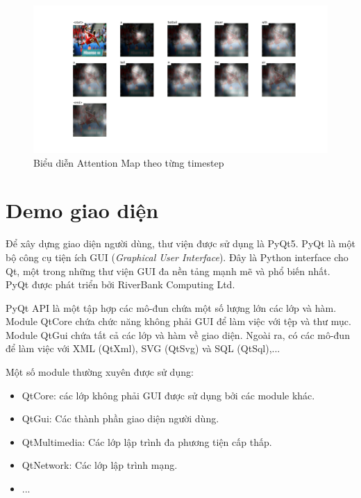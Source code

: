 \documentclass[14pt, a4paper]{article}
\numberwithin{equation}{section}
\numberwithin{algorithm}{section}
\numberwithin{figure}{section}
\numberwithin{table}{section}
\numberwithin{dl}{section}
\numberwithin{md}{section}
\numberwithin{bd}{section}
\numberwithin{dn}{section}
\numberwithin{hq}{section}
\begin{document}
    \begin{figure}[h!] \centering

        \includegraphics[scale=0.3]{Attention_Sample_2.png}
        \caption{Biểu diễn Attention Map theo từng timestep}
        \label{fig:Attention_Sample_2}

    \end{figure}
    
    \section{Demo giao diện}
    
    Để xây dựng giao diện người dùng, thư viện được sử dụng là PyQt5.
    PyQt là một bộ công cụ tiện ích GUI (\textit{Graphical User Interface}). 
    Đây là Python interface cho Qt, một trong những thư viện GUI đa nền tảng mạnh mẽ và phổ biến nhất. 
    PyQt được phát triển bởi RiverBank Computing Ltd.

    PyQt API là một tập hợp các mô-đun chứa một số lượng lớn các lớp và hàm. 
    Module QtCore chứa chức năng không phải GUI để làm việc với tệp và thư mục. 
    Module QtGui chứa tất cả các lớp và hàm về giao diện. Ngoài ra, có các mô-đun để làm việc với XML (QtXml), SVG (QtSvg) và SQL (QtSql),...

    Một số module thường xuyên được sử dụng:

    \begin{itemize}
        \item QtCore: các lớp không phải GUI được sử dụng bởi các module khác.
        \item QtGui: Các thành phần giao diện người dùng.
        \item QtMultimedia: Các lớp lập trình đa phương tiện cấp thấp.
        \item QtNetwork: Các lớp lập trình mạng.
        \item ...
    \end{itemize}
\end{document}
